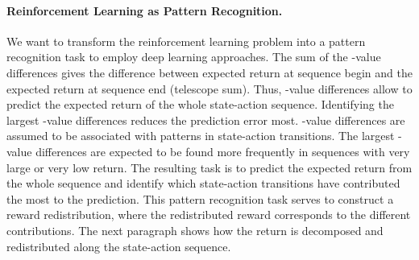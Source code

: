 \documentclass{article}
\begin{document}
\paragraph{Reinforcement Learning as Pattern Recognition.}
We want to transform the reinforcement learning problem into
a pattern recognition task to employ deep learning approaches.
The sum of the -value differences gives the 
difference between expected return at sequence begin and
the expected return at sequence end (telescope sum).
Thus, -value differences allow to predict the 
expected return of the whole state-action sequence.
Identifying the largest -value differences 
reduces the prediction error most.
-value differences are assumed to be associated with
patterns in state-action transitions.
The largest -value differences 
are expected to be found more frequently in sequences
with very large or very low return.
The resulting task is to predict the expected return
from the whole sequence and identify which 
state-action transitions have contributed the most to the prediction.
This pattern recognition task serves to
construct a reward redistribution, where the redistributed reward
corresponds to the different contributions.
The next paragraph shows how the return is decomposed and redistributed
along the state-action sequence.
\end{document}
